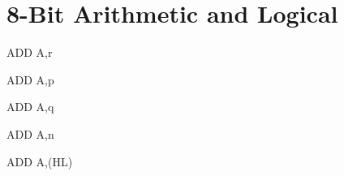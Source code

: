 \section{8-Bit Arithmetic and Logical}

\begin{minipage}{\textwidth}

\begin{instrtable}

	\begin{instruction}{ADD A,r}
			\FlagsADDr
	\end{instruction}

	\begin{instruction}{ADD A,p}
			\FlagsADDr
		\SkipToOpCode
			\Cycles{}{}
	\end{instruction}

	\begin{instruction}{ADD A,q} 
			\FlagsADDr
		\SkipToOpCode
	\end{instruction}

	\begin{instruction}{ADD A,n}
			\FlagsADDr
		\SkipToOpCode
	\end{instruction}

	\begin{instruction}{ADD A,(HL)}
			\FlagsADDr
	\end{instruction}


\end{instrtable}
\end{minipage}
